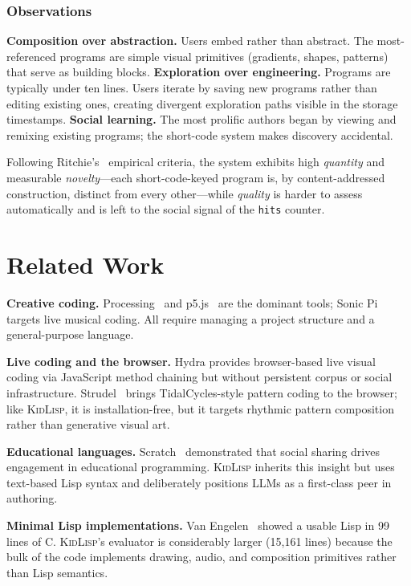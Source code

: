 \documentclass[letterpaper]{article}
\begin{document}
\subsubsection{Observations}
\textbf{Composition over abstraction.} Users embed rather than abstract. The most-referenced programs are simple visual primitives (gradients, shapes, patterns) that serve as building blocks.
\textbf{Exploration over engineering.} Programs are typically under ten lines. Users iterate by saving new programs rather than editing existing ones, creating divergent exploration paths visible in the storage timestamps.
\textbf{Social learning.} The most prolific authors began by viewing and remixing existing programs; the short-code system makes discovery accidental.

Following Ritchie's~ empirical criteria, the system exhibits high \emph{quantity} and measurable \emph{novelty}---each short-code-keyed program is, by content-addressed construction, distinct from every other---while \emph{quality} is harder to assess automatically and is left to the social signal of the \texttt{hits} counter.

\section{Related Work}

\textbf{Creative coding.} Processing~\cite{reas2007processing} and p5.js~\cite{mccarthy2015p5js} are the dominant tools; Sonic Pi~\cite{aaron2016sonic} targets live musical coding. All require managing a project structure and a general-purpose language.

\textbf{Live coding and the browser.} Hydra provides browser-based live visual coding via JavaScript method chaining but without persistent corpus or social infrastructure. Strudel~\cite{roos2023strudel} brings TidalCycles-style pattern coding to the browser; like \textsc{KidLisp}, it is installation-free, but it targets rhythmic pattern composition rather than generative visual art.

\textbf{Educational languages.} Scratch~\cite{resnick2009scratch} demonstrated that social sharing drives engagement in educational programming. \textsc{KidLisp} inherits this insight but uses text-based Lisp syntax and deliberately positions LLMs as a first-class peer in authoring.

\textbf{Minimal Lisp implementations.} Van Engelen~\cite{vanengelen2022tinylisp} showed a usable Lisp in 99 lines of C. \textsc{KidLisp}'s evaluator is considerably larger (15{,}161 lines) because the bulk of the code implements drawing, audio, and composition primitives rather than Lisp semantics.
\end{document}
